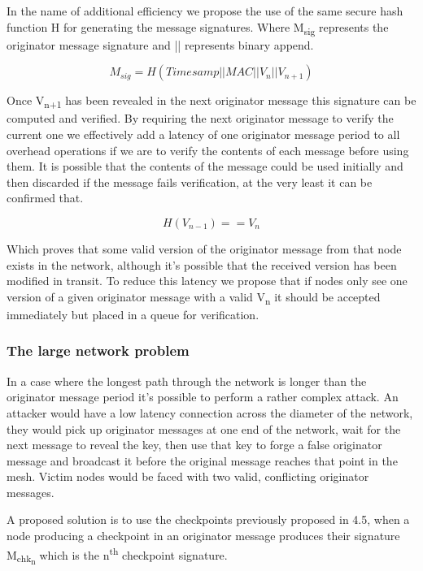 \documentclass[11pt]{article}
\begin{document}
               
               In the name of additional efficiency we propose the use of the same secure hash function H for generating the message signatures. Where M\textsubscript{sig} represents the originator message signature and || represents binary append.
               
               \[M_{sig} = H(Timesamp||MAC||V_n||V_{n+1})\]
               
               Once V\textsubscript{n+1} has been revealed in the next originator message this signature can be computed and verified. By requiring the next originator message to verify the current one we effectively add a latency of one originator message period to all overhead operations if we are to verify the contents of each message before using them. It is possible that the contents of the message could be used initially and then discarded if the message fails verification, at the very least it can be confirmed that.
                     
                     \[H(V_{n-1}) == V_n\]
                     
               Which proves that some valid version of the originator message from that node exists in the network, although it's possible that the received version has been modified in transit. To reduce this latency we propose that if nodes only see one version of a given originator message with a valid V\textsubscript{n} it should be accepted immediately but placed in a queue for verification.
               
               \subsubsection{The large network problem}
                        
                        In a case where the longest path through the network is longer than the originator message period it's possible to perform a rather complex attack. An attacker would have a low latency connection across the diameter of the network, they would pick up originator messages at one end of the network, wait for the next message to reveal the key, then use that key to forge a false originator message and broadcast it before the original message reaches that point in the mesh. Victim nodes would be faced with two valid, conflicting originator messages.
                        
                        A proposed solution is to use the checkpoints previously proposed in 4.5, when a node producing a checkpoint in an originator message produces their signature M\textsubscript{chk\textsubscript{n}} which is the n\textsuperscript{th} checkpoint signature.
                        
\end{document}
